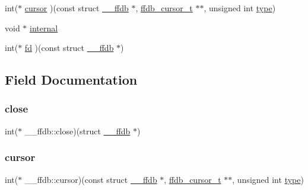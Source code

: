 \begin{DoxyCompactItemize}
\item 
int($\ast$ \mbox{\hyperlink{struct____ffdb_ab1af66b7fce841cd41df4da117a13009}{cursor}} )(const struct \mbox{\hyperlink{struct____ffdb}{\+\_\+\+\_\+ffdb}} $\ast$, \mbox{\hyperlink{adat-devel_2other__libs_2filedb_2filehash_2ffdb__db_8h_a1383f6fb3966b0ca74206ba93b687fd9}{ffdb\+\_\+cursor\+\_\+t}} $\ast$$\ast$, unsigned int \mbox{\hyperlink{struct____ffdb_a97cc74bb16c35a0a927331f4e2aa0734}{type}})
\item 
void $\ast$ \mbox{\hyperlink{struct____ffdb_af883642213f91052caf45c51b25dd69d}{internal}}
\item 
int($\ast$ \mbox{\hyperlink{struct____ffdb_a24c4b1701425fc71436f66031f40f784}{fd}} )(const struct \mbox{\hyperlink{struct____ffdb}{\+\_\+\+\_\+ffdb}} $\ast$)
\end{DoxyCompactItemize}


\subsection{Field Documentation}
\mbox{\label{struct____ffdb_a5619a53c055a8822d1ee1f75eb5308f6}} 
\subsubsection{\texorpdfstring{close}{close}}
{\footnotesize\ttfamily int($\ast$ \+\_\+\+\_\+ffdb\+::close)(struct \mbox{\hyperlink{struct____ffdb}{\+\_\+\+\_\+ffdb}} $\ast$)}

\mbox{\label{struct____ffdb_ab1af66b7fce841cd41df4da117a13009}} 
\subsubsection{\texorpdfstring{cursor}{cursor}}
{\footnotesize\ttfamily int($\ast$ \+\_\+\+\_\+ffdb\+::cursor)(const struct \mbox{\hyperlink{struct____ffdb}{\+\_\+\+\_\+ffdb}} $\ast$, \mbox{\hyperlink{adat-devel_2other__libs_2filedb_2filehash_2ffdb__db_8h_a1383f6fb3966b0ca74206ba93b687fd9}{ffdb\+\_\+cursor\+\_\+t}} $\ast$$\ast$, unsigned int \mbox{\hyperlink{struct____ffdb_a97cc74bb16c35a0a927331f4e2aa0734}{type}})}

\mbox{\label{struct____ffdb_a88791473b56c4423cc6599c92f960973}} 
